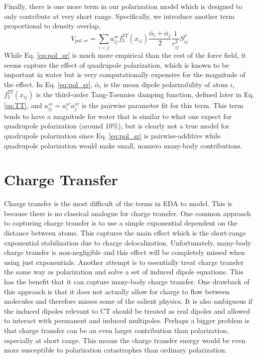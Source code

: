 \documentclass[journal=jacsat,manuscript=article]{achemso}
\begin{document}
Finally, there is one more term in our polarization model which is designed to only contribute at very
short range. Specifically, we introduce another term proportional to density overlap,
\begin{equation}
  V_{pol,sr}=\sum_{i<j}a_{ij}^{sr}f_3^{TT}(x_{ij})\frac{\bar{\alpha}_i + \bar{\alpha}_j}{2}\frac{1}{r_{ij}^3}S_{ij}^{\rho}
\label{eq:pol_sr}
\end{equation}
\noindent
While Eq. \ref{eq:pol_sr} is much more empirical than the rest of the force field,
it seems capture the effect of quadrupole polarization, which is known to be important
in water\cite{herman2023accurate} but is very computationally expensive for the magnitude of the effect.
In Eq. \ref{eq:pol_sr}, $\bar{\alpha}_i$ is the mean dipole polarizability of atom $i$, $f_3^{TT}(x_{ij})$
is the third-order Tang-Toennies damping function, defined later in Eq. \ref{eq:TT}, and $a_{ij}^{sr}=a_{i}^{sr}a_{j}^{sr}$ is
the pairwise parameter fit for this term. This term tends to have a magnitude for water
that is similar to what one expect for quadrupole polarization (around 10\%), but is clearly
not a true model for quadrupole polarization since Eq. \ref{eq:pol_sr} is pairwise-additive
while quadrupole polarization would make small, nonzero many-body contributions.

\section*{Charge Transfer}
Charge transfer is the most difficult of the terms in EDA to model. This is
because there is no classical analogue for charge transfer. One common approach to
capturing charge transfer is to use a simple exponential dependent on the distance
between atoms.\cite{rackers2021polarizable} This captures the main effect which is the
short-range exponential stabilization due to charge delocalization. Unfortunately,
many-body charge transfer is non-negligible and this effect will be completely
missed when using just exponentials. Another attempt is to essentially treat
charge transfer the same way as polarization and solve a set of induced dipole equations.\cite{das2019development,wang2023general}
This has the benefit that it can capture many-body charge transfer. One drawback of this
approach is that it does not actually allow for charge to flow between molecules
and therefore misses some of the salient physics. It is also ambiguous if the induced
dipoles relevant to CT should be treated as real dipoles and allowed to interact 
with permanent and induced multipoles. Perhaps a bigger problem is that
charge transfer can be an even larger contribution than polarization, especially at short range.
This means the charge transfer energy would be even more susceptible to
polarization catastrophes than ordinary polarization.
\end{document}
